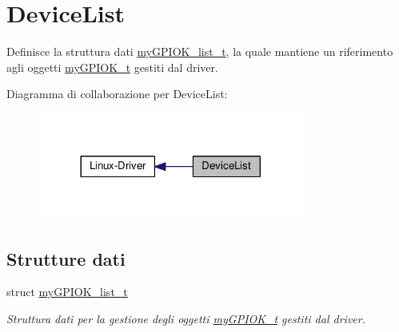\hypertarget{group___device_list}{\section{Device\+List}
\label{group___device_list}
}


Definisce la struttura dati \hyperlink{structmy_g_p_i_o_k__list__t}{my\+G\+P\+I\+O\+K\+\_\+list\+\_\+t}, la quale mantiene un riferimento agli oggetti \hyperlink{structmy_g_p_i_o_k__t}{my\+G\+P\+I\+O\+K\+\_\+t} gestiti dal driver.  


Diagramma di collaborazione per Device\+List\+:\nopagebreak
\begin{figure}[H]
\begin{center}
\leavevmode
\includegraphics[width=248pt]{group___device_list}
\end{center}
\end{figure}
\subsection*{Strutture dati}
\begin{DoxyCompactItemize}
\item 
struct \hyperlink{structmy_g_p_i_o_k__list__t}{my\+G\+P\+I\+O\+K\+\_\+list\+\_\+t}
\begin{DoxyCompactList}\small\item\em Struttura dati per la gestione degli oggetti \hyperlink{structmy_g_p_i_o_k__t}{my\+G\+P\+I\+O\+K\+\_\+t} gestiti dal driver. \end{DoxyCompactList}\end{DoxyCompactItemize}

